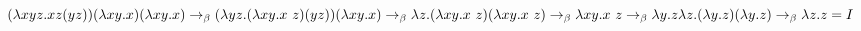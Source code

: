 \documentclass[12pt]{article}
\begin{document}
\noindent
$\noindent  (\lambda xyz.xz(yz))(\lambda xy.x)(\lambda xy.x) \rightarrow_\beta \\
  (\lambda yz.(\lambda xy.x\ z)(yz))(\lambda xy.x) \rightarrow_\beta \\
  \lambda z.(\lambda xy.x\ z)(\lambda xy.x\ z) \rightarrow_{\beta} \\
  \\
  \lambda xy.x\ z \rightarrow_{\beta} \\
  \lambda y.z \\
  \\
  \lambda z.(\lambda y.z)(\lambda y.z) \rightarrow_\beta \\
  \lambda z.z = I \\ $ 
\end{document}
